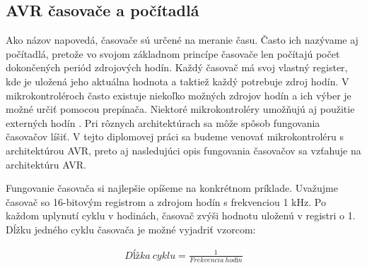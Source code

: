 \setcounter{tocdepth}{4}
\setcounter{secnumdepth}{4}

\subsection{AVR časovače a počítadlá}
\noindent

Ako názov napovedá, časovače sú určené na meranie času. Často ich nazývame aj počítadlá,
pretože vo svojom základnom princípe časovače len počítajú počet dokončených periód zdrojových hodín.
Každý časovač má svoj vlastný register, kde je uložená jeho aktuálna hodnota a taktiež každý potrebuje zdroj hodín. V mikrokontroléroch často existuje niekoľko možných zdrojov
hodín a ich výber je možné určiť pomocou prepínača. Niektoré mikrokontroléry umožňujú aj použitie
externých hodín \cite{IntroductionMicrocontrollerTimers}. Pri rôznych architektúrach sa môže spôsob fungovania časovačov líšiť. V tejto diplomovej práci sa budeme venovať
mikrokontroléru s architektúrou AVR, preto aj nasledujúci opis fungovania časovačov sa vzťahuje na architektúru AVR.\par
Fungovanie časovača si najlepšie opíšeme na konkrétnom príklade.
Uvažujme časovač so 16-bitovým registrom a zdrojom hodín s frekvenciou 1 \acrshort{kHz}. Po každom uplynutí cyklu v hodinách, časovač
zvýši hodnotu uloženú v registri o 1. Dĺžku jedného cyklu časovača je možné vyjadriť vzorcom:

\begin{equation}
    \begin{aligned}
        Dĺžka\:cyklu = \frac{1}{Frekvencia\:hodín}
    \end{aligned}
\end{equation}

